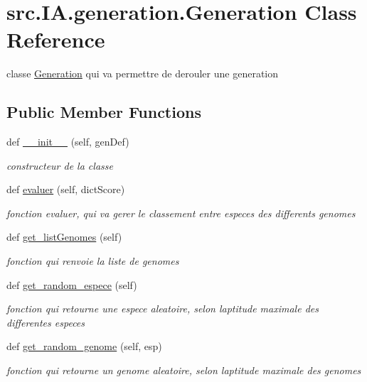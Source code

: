 \hypertarget{classsrc_1_1_i_a_1_1generation_1_1_generation}{}\section{src.\+I\+A.\+generation.\+Generation Class Reference}
\label{classsrc_1_1_i_a_1_1generation_1_1_generation}


classe \hyperlink{classsrc_1_1_i_a_1_1generation_1_1_generation}{Generation} qui va permettre de derouler une generation  


\subsection*{Public Member Functions}
\begin{DoxyCompactItemize}
\item 
def \hyperlink{classsrc_1_1_i_a_1_1generation_1_1_generation_af1a9b4e0d54cf2d95b643ee32f0a7785}{\+\_\+\+\_\+init\+\_\+\+\_\+} (self, gen\+Def)
\begin{DoxyCompactList}\small\item\em constructeur de la classe \end{DoxyCompactList}\item 
def \hyperlink{classsrc_1_1_i_a_1_1generation_1_1_generation_a78b1356928bb19d81bd0f231c8a64e1f}{evaluer} (self, dict\+Score)
\begin{DoxyCompactList}\small\item\em fonction evaluer, qui va gerer le classement entre especes des differents genomes \end{DoxyCompactList}\item 
def \hyperlink{classsrc_1_1_i_a_1_1generation_1_1_generation_a9455cb1f619593f816b4fafc6745a9c3}{get\+\_\+list\+Genomes} (self)
\begin{DoxyCompactList}\small\item\em fonction qui renvoie la liste de genomes \end{DoxyCompactList}\item 
def \hyperlink{classsrc_1_1_i_a_1_1generation_1_1_generation_a2eb297f2df213ec76e73ff2fc0859646}{get\+\_\+random\+\_\+espece} (self)
\begin{DoxyCompactList}\small\item\em fonction qui retourne une espece aleatoire, selon l\textquotesingle{}aptitude maximale des differentes especes \end{DoxyCompactList}\item 
def \hyperlink{classsrc_1_1_i_a_1_1generation_1_1_generation_a71f3acb01620d956f34f37c0abb0a6ec}{get\+\_\+random\+\_\+genome} (self, esp)
\begin{DoxyCompactList}\small\item\em fonction qui retourne un genome aleatoire, selon l\textquotesingle{}aptitude maximale des genomes \end{DoxyCompactList}\end{DoxyCompactItemize}
